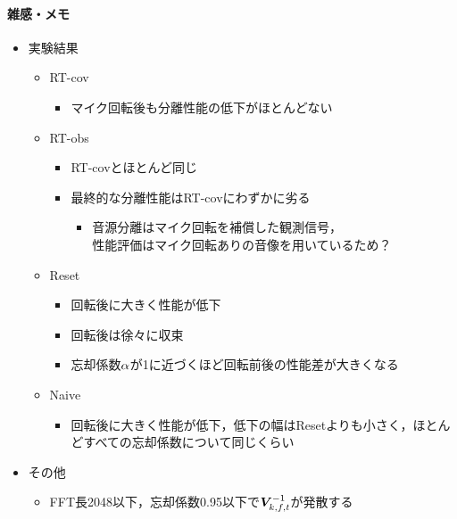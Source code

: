 \documentclass[sip,biber]{now-journal}
\begin{document}
\paragraph{雑感・メモ}
\begin{itemize}
  \item 実験結果
    \begin{itemize}
      \item RT-cov
        \begin{itemize}
          \item マイク回転後も分離性能の低下がほとんどない
        \end{itemize}
      \item RT-obs
        \begin{itemize}
          \item RT-covとほとんど同じ
          \item 最終的な分離性能はRT-covにわずかに劣る
            \begin{itemize}
              \item 音源分離はマイク回転を補償した観測信号，\\性能評価はマイク回転ありの音像を用いているため？
            \end{itemize}
        \end{itemize}
      \item Reset
        \begin{itemize}
          \item 回転後に大きく性能が低下
          \item 回転後は徐々に収束
          \item 忘却係数$\alpha$が1に近づくほど回転前後の性能差が大きくなる
        \end{itemize}
      \item Naive
        \begin{itemize}
          \item 回転後に大きく性能が低下，低下の幅はResetよりも小さく，ほとんどすべての忘却係数について同じくらい
        \end{itemize}
    \end{itemize}
  \item その他
    \begin{itemize}
      \item FFT長2048以下，忘却係数0.95以下で$\cov _{\src,\ft} ^{-1}$が発散する
    \end{itemize}
\end{itemize}
\end{document}
